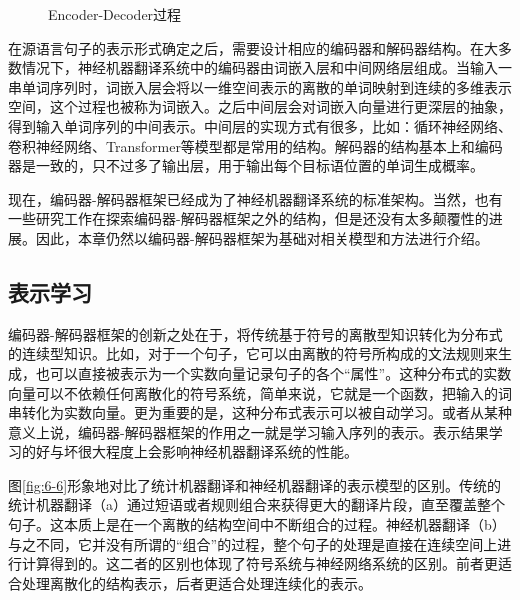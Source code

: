 \begin{figure}[htp]
\centering

\caption{ Encoder-Decoder过程 }
\label{fig:6-5}
\end{figure}

\parinterval  在源语言句子的表示形式确定之后，需要设计相应的编码器和解码器结构。在大多数情况下，神经机器翻译系统中的编码器由词嵌入层和中间网络层组成。当输入一串单词序列时，词嵌入层会将以一维空间表示的离散的单词映射到连续的多维表示空间，这个过程也被称为词嵌入。之后中间层会对词嵌入向量进行更深层的抽象，得到输入单词序列的中间表示。中间层的实现方式有很多，比如：循环神经网络、卷积神经网络、Transformer等模型都是常用的结构。解码器的结构基本上和编码器是一致的，只不过多了输出层，用于输出每个目标语位置的单词生成概率。

\parinterval  现在，编码器-解码器框架已经成为了神经机器翻译系统的标准架构。当然，也有一些研究工作在探索编码器-解码器框架之外的结构\cite{Li2020NeuralMT}，但是还没有太多颠覆性的进展。因此，本章仍然以编码器-解码器框架为基础对相关模型和方法进行介绍。


\subsection{表示学习}

\parinterval 编码器-解码器框架的创新之处在于，将传统基于符号的离散型知识转化为分布式的连续型知识。比如，对于一个句子，它可以由离散的符号所构成的文法规则来生成，也可以直接被表示为一个实数向量记录句子的各个``属性''。这种分布式的实数向量可以不依赖任何离散化的符号系统，简单来说，它就是一个函数，把输入的词串转化为实数向量。更为重要的是，这种分布式表示可以被自动学习。或者从某种意义上说，编码器-解码器框架的作用之一就是学习输入序列的表示。表示结果学习的好与坏很大程度上会影响神经机器翻译系统的性能。

\parinterval 图\ref{fig:6-6}形象地对比了统计机器翻译和神经机器翻译的表示模型的区别。传统的统计机器翻译（a）通过短语或者规则组合来获得更大的翻译片段，直至覆盖整个句子。这本质上是在一个离散的结构空间中不断组合的过程。神经机器翻译（b）与之不同，它并没有所谓的``组合''的过程，整个句子的处理是直接在连续空间上进行计算得到的。这二者的区别也体现了符号系统与神经网络系统的区别。前者更适合处理离散化的结构表示，后者更适合处理连续化的表示。

